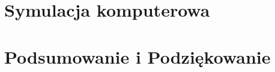 \documentclass[12pt, a4paper]{report}
\begin{document}
\clearpage 

\tableofcontents

\setlength{\baselineskip}{18pt}
\clearpage 

\clearpage 

\clearpage 

\chapter{Symulacja komputerowa}

\chapter{Podsumowanie i Podziękowanie}

\clearpage 
\end{document}

